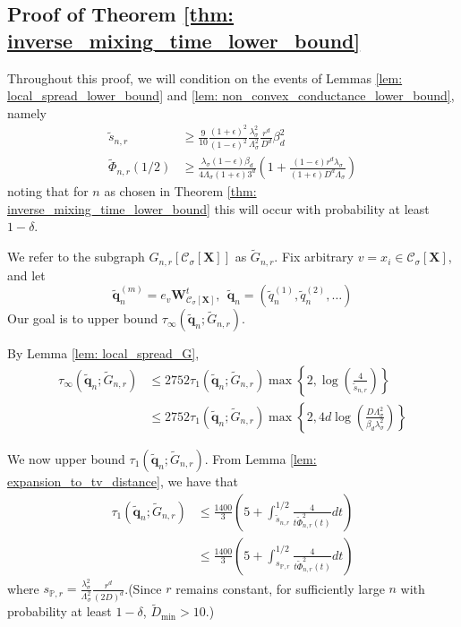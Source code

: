 \documentclass{article}
\newcommand{\1}{\mathbf{1}}
\newcommand{\qbf}{\mathbf{q}}
\newcommand{\Xbf}{\mathbf{X}}
\newcommand{\Wbf}{\mathbf{W}}
\newcommand{\Pbb}{\mathbb{P}}
\newcommand{\Cset}{\mathcal{C}}
\newcommand{\Csig}{\Cset_{\sigma}}
\theoremstyle{aldenthm}
\begin{document}
\subsection{Proof of Theorem \ref{thm: inverse_mixing_time_lower_bound}}
Throughout this proof, we will condition on the events of Lemmas \ref{lem: local_spread_lower_bound} and \ref{lem: non_convex_conductance_lower_bound},
namely
\begin{align*}
\widetilde{s}_{n,r} & \geq \frac{9}{10} \frac{(1 + \epsilon)^2}{(1 - \epsilon)^2}\frac{\lambda_{\sigma}^2}{\Lambda_{\sigma}^2} \frac{r^d}{D^d} \beta_d^2 \\
\widetilde{\Phi}_{n,r}(1/2) & \geq \frac{\lambda_{\sigma}(1 - \epsilon)\beta_d}{4\Lambda_{\sigma}(1 + \epsilon)3^d} \left(1 + \frac{(1 - \epsilon)r^d\lambda_{\sigma}}{(1 + \epsilon)D^d\Lambda_{\sigma}}\right)
\end{align*}
noting that for $n$ as chosen in Theorem \ref{thm: inverse_mixing_time_lower_bound} this will occur with probability at least $1 - \delta$.

We refer to the subgraph $G_{n,r}\left[\Csig[\Xbf]\right]$ as $\widetilde{G}_{n,r}$. Fix arbitrary $v = x_i \in \Csig[\Xbf]$, and let
\begin{equation*}
\widetilde{\qbf}_n^{(m)} = e_v \Wbf_{\Csig[\Xbf]}^t, ~~ \widetilde{\qbf}_n = (\widetilde{q}_n^{(1)}, \widetilde{q}_n^{(2)}, \ldots)
\end{equation*}
Our goal is to upper bound $\tau_{\infty}(\widetilde{\qbf}_n; \widetilde{G}_{n,r})$.

By Lemma \ref{lem: local_spread_G},
\begin{align*}
\tau_{\infty}(\widetilde{\qbf}_n; \widetilde{G}_{n,r}) & \leq 2752 \tau_{1}(\widetilde{\qbf}_n; \widetilde{G}_{n,r}) \max\left\{2, \log\left(\frac{4}{\widetilde{s}_{n,r}}\right) \right\} \nonumber \\
& \leq 2752 \tau_{1}(\widetilde{\qbf}_n; \widetilde{G}_{n,r}) \max\left\{2, 4d\log\left(\frac{D \Lambda_{\sigma}^2}{\beta_d \lambda_{\sigma}^2}\right) \right\}
\end{align*} 

We now upper bound $\tau_{1}(\widetilde{\qbf}_n; \widetilde{G}_{n,r})$.  From Lemma \ref{lem: expansion_to_tv_distance}, we have that
\begin{align}
\label{eqn: mixing_time_bound_on_neighborhood_graph_thm2}
\tau_{1}(\widetilde{\qbf}_n; \widetilde{G}_{n,r}) & \leq \frac{1400}{3}\left(5 + \int_{\widetilde{s}_{n,r}}^{1/2} \frac{4}{t\widetilde{\Phi}_{n,r}^2(t)} dt\right) \nonumber \\
& \leq \frac{1400}{3}\left(5 + \int_{ s_{\Pbb,r}}^{1/2} \frac{4}{t\widetilde{\Phi}_{n,r}^2(t)} dt \right)
\end{align}
where $s_{\Pbb,r} = \frac{\lambda_{\sigma}^2}{\Lambda_{\sigma}^2} \frac{r^d}{(2D)^d}$.(Since $r$ remains constant, for sufficiently large $n$ with probability at least $1 - \delta$, $\widetilde{D}_{\min} > 10$.)
\end{document}
